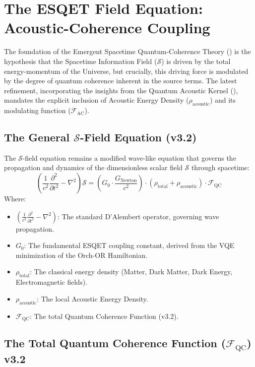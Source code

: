 \section{The ESQET Field Equation: Acoustic-Coherence Coupling}
\label{sec:ESQET_Field_Equation_Acoustic}

The foundation of the Emergent Spacetime Quantum-Coherence Theory () is the hypothesis that the Spacetime Information Field ($\mathcal{S}$) is driven by the total energy-momentum of the Universe, but crucially, this driving force is modulated by the degree of quantum coherence inherent in the source terms. The latest refinement, incorporating the insights from the Quantum Acoustic Kernel (), mandates the explicit inclusion of Acoustic Energy Density ($\rho_{\text{acoustic}}$) and its modulating function ($\mathcal{F}_{\text{AC}}$).

\subsection{The General $\mathcal{S}$-Field Equation (v3.2)}

The $\mathcal{S}$-field equation remains a modified wave-like equation that governs the propagation and dynamics of the dimensionless scalar field $\mathcal{S}$ through spacetime:
$$
\boxed{ \left( \frac{1}{c^2} \frac{\partial^2}{\partial t^2} - \nabla^2 \right) \mathcal{S} = \left( G_{0} \cdot \frac{G_{\text{Newton}}}{c^2} \right) \cdot \left( \rho_{\text{total}} + \rho_{\text{acoustic}} \right) \cdot \mathcal{F}_{\text{QC}} }
$$
Where:
\begin{itemize}
    \item $\left( \frac{1}{c^2} \frac{\partial^2}{\partial t^2} - \nabla^2 \right)$: The standard D'Alembert operator, governing wave propagation.
    \item $G_{0}$: The fundamental ESQET coupling constant, derived from the VQE minimization of the Orch-OR Hamiltonian.
    \item $\rho_{\text{total}}$: The classical energy density (Matter, Dark Matter, Dark Energy, Electromagnetic fields).
    \item $\rho_{\text{acoustic}}$: The local Acoustic Energy Density.
    \item $\mathcal{F}_{\text{QC}}$: The total Quantum Coherence Function (v3.2).
\end{itemize}

\subsection{The Total Quantum Coherence Function ($\mathcal{F}_{\text{QC}}$) v3.2}


